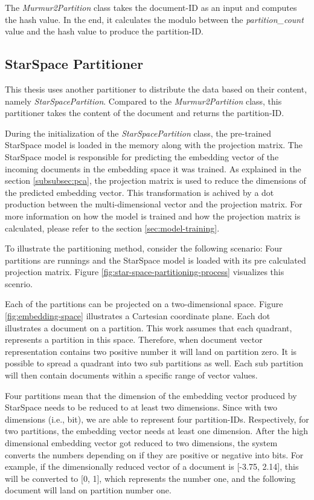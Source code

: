 The \emph{Murmur2Partition} class takes the document-ID as an input and computes the hash value. In the end, it calculates the modulo between the \emph{partition\_count} value and the hash value to produce the partition-ID. 

\subsection{StarSpace Partitioner}
\label{subsec:partitioning-star-space}
This thesis uses another partitioner to distribute the data based on their content, namely \emph{StarSpacePartition}. Compared to the \emph{Murmur2Partition} class, this partitioner takes the content of the document and returns the partition-ID.


During the initialization of the \emph{StarSpacePartition} class, the pre-trained StarSpace model is loaded in the memory along with the projection matrix. The StarSpace model is responsible for predicting the embedding vector of the incoming documents in the embedding space it was trained. As explained in the section \ref{subsubsec:pca}, the projection matrix is used to reduce the dimensions of the predicted embedding vector. This transformation is achived by a dot production between the multi-dimensional vector and the projection matrix. For more information on how the model is trained and how the projection matrix is calculated, please refer to the section \ref{sec:model-training}.


To illustrate the partitioning method, consider the following scenario: Four partitions are runnings and the StarSpace model is loaded with its pre calculated projection matrix. Figure \ref{fig:star-space-partitioning-process} visualizes this scenrio. 

Each of the partitions can be projected on a two-dimensional space. Figure \ref{fig:embedding-space} illustrates a Cartesian coordinate plane. Each dot illustrates a document on a partition. This work assumes that each quadrant, represents a partition in this space. Therefore, when document vector representation contains two positive number it will land on partition zero. It is possible to spread a quadrant into two sub partitions as well. Each sub partition will then contain documents within a specific range of vector values.


Four partitions mean that the dimension of the embedding vector produced by StarSpace needs to be reduced to at least two dimensions. Since with two dimensions (i.e., bit), we are able to represent four partition-IDs. Respectively, for two partitions, the embedding vector needs at least one dimension. After the high dimensional embedding vector got reduced to two dimensions, the system converts the numbers depending on if they are positive or negative into bits. For example, if the dimensionally reduced vector of a document is [-3.75, 2.14], this will be converted to [0, 1], which represents the number one, and the following document will land on partition number one.


